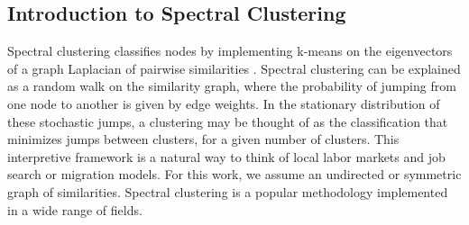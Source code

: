 %





\subsection{Introduction to Spectral Clustering}

Spectral clustering classifies nodes by implementing k-means on the eigenvectors of a graph Laplacian of pairwise similarities \citep{vonLuxburg2007}. Spectral clustering can be explained as a random walk on the similarity graph, where the probability of jumping from one node to another is given by edge weights. In the stationary distribution of these stochastic jumps, a clustering may be thought of as the classification that minimizes jumps between clusters, for a given number of clusters. This interpretive framework is a natural way to think of local labor markets and job search or migration models. For this work, we assume an undirected or symmetric graph of similarities. Spectral clustering is a popular methodology implemented in a wide range of fields.

